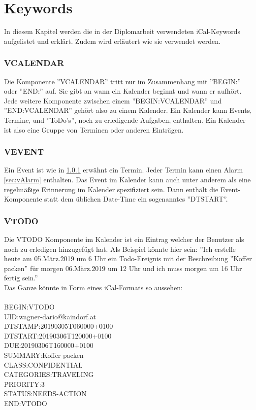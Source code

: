 \section{Keywords} 
\label{sec:keywords}
In diesem Kapitel werden die in der Diplomarbeit verwendeten iCal-Keywords aufgelistet und erklärt. Zudem wird erläutert wie sie verwendet werden. 
\subsubsection{VCALENDAR}
\label{sec:vCalendar}
Die Komponente ''VCALENDAR'' tritt nur im Zusammenhang mit ''BEGIN:'' oder ''END:'' auf. Sie gibt an wann ein Kalender beginnt und wann er aufhört. Jede weitere Komponente zwischen einem ''BEGIN:VCALENDAR'' und ''END:VCALENDAR'' gehört also zu einem Kalender. Ein Kalender kann Events, Termine, und ''ToDo's'', noch zu erledigende Aufgaben, enthalten. Ein Kalender ist also eine Gruppe von Terminen oder anderen Einträgen. 
\subsubsection{VEVENT} 
\label{sec:vEvent}
Ein Event ist wie in \ref{sec:vCalendar} erwähnt ein Termin. Jeder Termin kann einen Alarm \ref{sec:vAlarm} enthalten. Das Event im Kalender kann auch unter anderem als eine regelmäßige Erinnerung im Kalender spezifiziert sein. Dann enthält die Event-Komponente statt dem üblichen Date-Time ein sogenanntes ''DTSTART''.
\subsubsection{VTODO}
\label{sec:vTodo} 
Die VTODO Komponente im Kalender ist ein Eintrag welcher der Benutzer als noch zu erledigen hinzugefügt hat. Als Beispiel könnte hier sein: ''Ich erstelle heute am 05.März.2019 um 6 Uhr ein Todo-Ereignis mit der Beschreibung ''Koffer packen'' für morgen 06.März.2019 um 12 Uhr und ich muss morgen um 16 Uhr fertig sein.'' \\
Das Ganze könnte in Form eines iCal-Formats so aussehen: \\ \\
  BEGIN:VTODO \\
  UID:wagner-dario@kaindorf.at\\
  DTSTAMP:20190305T060000+0100\\
  DTSTART:20190306T120000+0100\\
  DUE:20190306T160000+0100\\
  SUMMARY:Koffer packen\\
  CLASS:CONFIDENTIAL\\
  CATEGORIES:TRAVELING\\
  PRIORITY:3\\
  STATUS:NEEDS-ACTION\\
  END:VTODO\\
